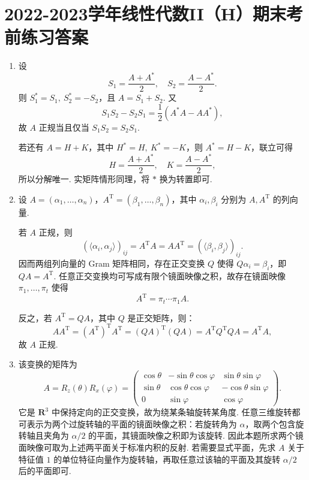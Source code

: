 \section{2022-2023学年线性代数II（H）期末考前练习答案}

\begin{enumerate}
    \item 设
    \[
        S_1=\frac{A+A^*}{2},\quad S_2=\frac{A-A^*}{2}.
    \]
    则 $S_1^*=S_1,\ S_2^*=-S_2$，且 $A=S_1+S_2$. 又
    \[
        S_1S_2-S_2S_1=\frac12(A^*A-AA^*),
    \]
    故 $A$ 正规当且仅当 $S_1S_2=S_2S_1$.

    若还有 $A=H+K$，其中 $H^*=H,\ K^*=-K$，则 $A^* = H-K$，联立可得
    \[
        H=\frac{A+A^*}{2},\quad K=\frac{A-A^*}{2},
    \]
    所以分解唯一. 实矩阵情形同理，将 $*$ 换为转置即可.

    \item 设 $A=(\alpha_1,\ldots,\alpha_n)$，$A^{\mathrm{T}}=(\beta_1,\ldots,\beta_n)$，其中 $\alpha_i,\beta_i$ 分别为 $A,A^{\mathrm{T}}$ 的列向量.

    若 $A$ 正规，则
    \[
        (\langle \alpha_i,\alpha_j\rangle)_{ij}=A^{\mathrm{T}}A=AA^{\mathrm{T}}
        =(\langle \beta_i,\beta_j\rangle)_{ij}.
    \]
    因而两组列向量的 Gram 矩阵相同，存在正交变换 $Q$ 使得 $Q\alpha_i=\beta_i$，即 $QA=A^{\mathrm{T}}$. 任意正交变换均可写成有限个镜面映像之积，故存在镜面映像 $\pi_1,\ldots,\pi_t$ 使得
    \[
        A^{\mathrm{T}}=\pi_t\cdots\pi_1A.
    \]

    反之，若 $A^{\mathrm{T}}=QA$，其中 $Q$ 是正交矩阵，则：
    \[
        AA^{\mathrm{T}}=(A^{\mathrm{T}})^{\mathrm{T}}A^{\mathrm{T}}=(QA)^{\mathrm{T}}(QA)=A^\mathrm{T}Q^\mathrm{T}QA=A^{\mathrm{T}}A,
    \]
    故 $A$ 正规.

    \item 该变换的矩阵为
    \[
        A=R_z(\theta)R_x(\varphi)=
        \begin{pmatrix}
            \cos\theta&-\sin\theta\cos\varphi&\sin\theta\sin\varphi\\
            \sin\theta&\cos\theta\cos\varphi&-\cos\theta\sin\varphi\\
            0&\sin\varphi&\cos\varphi
        \end{pmatrix}.
    \]
    它是 $\mathbf{R}^3$ 中保持定向的正交变换，故为绕某条轴旋转某角度. 任意三维旋转都可表示为两个过旋转轴的平面的镜面映像之积：若旋转角为 $\alpha$，取两个包含旋转轴且夹角为 $\alpha/2$ 的平面，其镜面映像之积即为该旋转. 因此本题所求两个镜面映像可取为上述两平面关于标准内积的反射. 若需要显式平面，先求 $A$ 关于特征值 $1$ 的单位特征向量作为旋转轴，再取任意过该轴的平面及其旋转 $\alpha/2$ 后的平面即可.


\end{enumerate}
